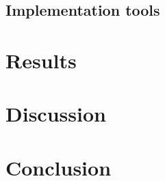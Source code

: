 \documentclass[
  pdftex,
  10pt,
  a4paper,
  oneside
]{article}
\begin{document}
  \newpage

  \subsection{Implementation tools}
  
  
  
  
  
  

  \newpage

  \section{Results}\label{sec:4-results}
  \newpage

  \section{Discussion}\label{sec:5-discussion}
  \newpage

  \section{Conclusion}\label{sec:6-conclusion}
  \newpage

  
  
  \newpage

  
\end{document}
